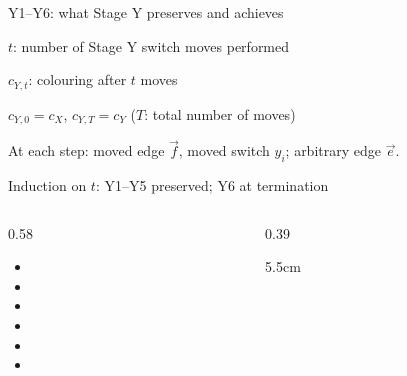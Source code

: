 \begin{frame}[t]{Y1--Y6: what Stage Y preserves and achieves}
  {\normalfont\small\color{black}
    $t$: number of Stage Y switch moves performed\par
    $c_{Y,t}$: colouring after $t$ moves\par
    $c_{Y,0}=c_X$, \quad $c_{Y,T}=c_Y$ \quad ($T$: total number of moves)\par
    At each step: moved edge $\vec f$, moved switch $y_i$; arbitrary edge $\vec e$.\par
    Induction on $t$: Y1--Y5 preserved; Y6 at termination\par
  }
  \smallskip
  \begin{columns}[T,onlytextwidth]
    \begin{column}{0.58\textwidth}
      \footnotesize{}
      \begin{itemize}[itemsep=5pt]
        \item<1-> \Yone
        \item<2-> \Ytwo
        \item<3-> \Ythree
        \item<4-> \Yfour
        \item<5-> \Yfive
        \item<6-> \Ysix
      \end{itemize}
    \end{column}
    \begin{column}{0.39\textwidth}
      \centering\small{}
      \begin{overlayarea}{\linewidth}{5.5cm}
        \raggedright
      \end{overlayarea}
    \end{column}
  \end{columns}
\end{frame}

